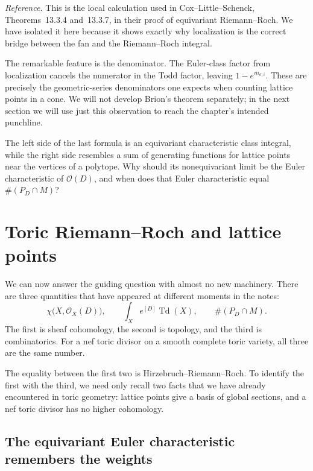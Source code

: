 \noindent
\textit{Reference.}
This is the local calculation used in Cox--Little--Schenck,
Theorems~13.3.4 and~13.3.7, in their proof of equivariant
Riemann--Roch.  We have isolated it here because it shows exactly why
localization is the correct bridge between the fan and the
Riemann--Roch integral.

The remarkable feature is the denominator.  The Euler-class factor
from localization cancels the numerator in the Todd factor, leaving
\(1-e^{m_{\sigma,i}}\).  These are precisely the geometric-series
denominators one expects when counting lattice points in a cone.  We
will not develop Brion's theorem separately; in the next section we
will use just this observation to reach the chapter's intended
punchline.

\begin{guidingquestion}
The left side of the last formula is an equivariant characteristic
class integral, while the right side resembles a sum of generating
functions for lattice points near the vertices of a polytope.  Why
should its nonequivariant limit be the Euler characteristic of
\(\mathcal O(D)\), and when does that Euler characteristic equal
\(\#(P_D\cap M)\)?
\end{guidingquestion}

\section{Toric Riemann--Roch and lattice points}
\label{sec:toric-rr-lattice-points}

We can now answer the guiding question with almost no new machinery.
There are three quantities that have appeared at different moments in
the notes:
\[
\chi\bigl(X,\mathcal O_X(D)\bigr),
\qquad
\int_X e^{[D]}\operatorname{Td}(X),
\qquad
\#(P_D\cap M).
\]
The first is sheaf cohomology, the second is topology, and the third is
combinatorics.  For a nef toric divisor on a smooth complete toric
variety, all three are the same number.

The equality between the first two is Hirzebruch--Riemann--Roch.  To
identify the first with the third, we need only recall two facts that
we have already encountered in toric geometry: lattice points give a
basis of global sections, and a nef toric divisor has no higher
cohomology.

\subsection{The equivariant Euler characteristic remembers the weights}

